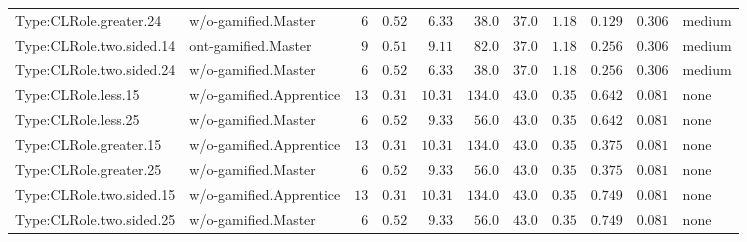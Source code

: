 \documentclass[6pt,a4paper]{article}
\begin{document}
{\begin{longtable}{llrrrrrrrrl}
Type:CLRole.greater.24&w/o-gamified.Master&$ 6$&$0.52$&$ 6.33$&$ 38.0$&$ 37.0$&$ 1.18$&$0.129$&$0.306$&medium\tabularnewline
Type:CLRole.two.sided.14&ont-gamified.Master&$ 9$&$0.51$&$ 9.11$&$ 82.0$&$ 37.0$&$ 1.18$&$0.256$&$0.306$&medium\tabularnewline
Type:CLRole.two.sided.24&w/o-gamified.Master&$ 6$&$0.52$&$ 6.33$&$ 38.0$&$ 37.0$&$ 1.18$&$0.256$&$0.306$&medium\tabularnewline
Type:CLRole.less.15&w/o-gamified.Apprentice&$13$&$0.31$&$10.31$&$134.0$&$ 43.0$&$ 0.35$&$0.642$&$0.081$&none\tabularnewline
Type:CLRole.less.25&w/o-gamified.Master&$ 6$&$0.52$&$ 9.33$&$ 56.0$&$ 43.0$&$ 0.35$&$0.642$&$0.081$&none\tabularnewline
Type:CLRole.greater.15&w/o-gamified.Apprentice&$13$&$0.31$&$10.31$&$134.0$&$ 43.0$&$ 0.35$&$0.375$&$0.081$&none\tabularnewline
Type:CLRole.greater.25&w/o-gamified.Master&$ 6$&$0.52$&$ 9.33$&$ 56.0$&$ 43.0$&$ 0.35$&$0.375$&$0.081$&none\tabularnewline
\newpage
Type:CLRole.two.sided.15&w/o-gamified.Apprentice&$13$&$0.31$&$10.31$&$134.0$&$ 43.0$&$ 0.35$&$0.749$&$0.081$&none\tabularnewline
Type:CLRole.two.sided.25&w/o-gamified.Master&$ 6$&$0.52$&$ 9.33$&$ 56.0$&$ 43.0$&$ 0.35$&$0.749$&$0.081$&none\tabularnewline
\hline
\end{longtable}}
\end{document}
